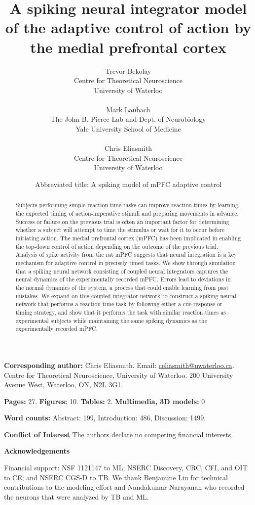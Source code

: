 \documentclass[11pt]{article}
\title{A spiking neural integrator model of the adaptive control of
  action by the medial prefrontal cortex}
\date{Abbreviated title: A spiking model of mPFC adaptive control}
\author{%
  Trevor Bekolay \\
  Centre for Theoretical Neuroscience \\
  University of Waterloo \\ ~ \\
  Mark Laubach \\
  The John B. Pierce Lab and Dept. of Neurobiology \\
  Yale University School of Medicine \\ ~ \\
  Chris Eliasmith \\
  Centre for Theoretical Neuroscience \\
  University of Waterloo}
\begin{document}
\maketitle

\textbf{Corresponding author:} Chris Eliasmith.
Email: \url{celiasmith@uwaterloo.ca}.
Centre for Theoretical Neuroscience, University of Waterloo.
200 University Avenue West, Waterloo, ON, N2L 3G1.

\textbf{Pages:} 27. \textbf{Figures:} 10. \textbf{Tables:} 2. \textbf{Multimedia, 3D models:} 0

\textbf{Word counts:} Abstract: 199, Introduction: 486, Discussion: 1499.

\textbf{Conflict of Interest}
The authors declare no competing financial interests.

\textbf{Acknowledgements}

Financial support: NSF 1121147 to ML;
NSERC Discovery, CRC, CFI, and OIT to CE;
and NSERC CGS-D to TB.
We thank Benjamine Liu for technical contributions
to the modeling effort and
Nandakumar Narayanan who recorded the neurons
that were analyzed by TB and ML.

\clearpage

\begin{abstract}
  Subjects performing simple reaction time tasks
  can improve reaction times by learning the expected timing
  of action-imperative stimuli
  and preparing movements in advance.
  Success or failure on the previous trial
  is often an important factor for determining
  whether a subject will attempt to time
  the stimulus or wait for it to occur
  before initiating action.
  The medial prefrontal cortex (mPFC) has been implicated
  in enabling the top-down control of action
  depending on the outcome of the previous trial.
  Analysis of spike activity from the rat mPFC
  suggests that neural integration is a key mechanism
  for adaptive control in precisely timed tasks.
  We show through simulation
  that a spiking neural network
  consisting of coupled neural integrators
  captures the neural dynamics
  of the experimentally recorded mPFC.
  Errors lead to deviations in the normal
  dynamics of the system,
  a process that could enable learning
  from past mistakes.
  We expand on this coupled integrator network
  to construct a spiking neural network that
  performs a reaction time task by following
  either a cue-response or timing strategy,
  and show that it performs the task
  with similar reaction times as experimental subjects
  while maintaining the same spiking dynamics
  as the experimentally recorded mPFC.
\end{abstract}
\end{document}
